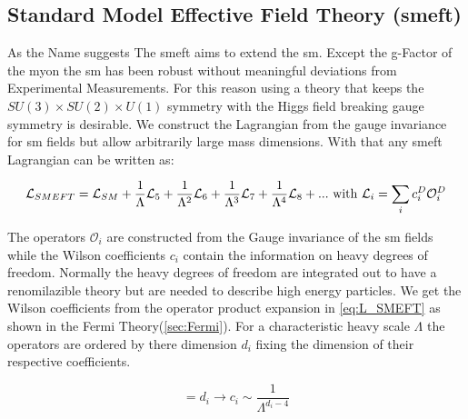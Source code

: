 \documentclass[../Bachelorarbeit.tex]{subfiles}
\begin{document}
\subsection{Standard Model Effective Field Theory (\acrshort{smeft})}
As the Name suggests The \acrshort{smeft} aims to extend the \acrshort{sm}.
Except the g-Factor of the myon the \acrshort{sm} has been robust without meaningful deviations from Experimental Measurements.
For this reason using a theory that keeps the $SU(3) \times SU(2) \times U(1)$ symmetry with the Higgs field breaking gauge symmetry is desirable.
We construct the Lagrangian from the gauge invariance for \acrshort{sm} fields but allow arbitrarily large mass dimensions.
With that any \acrshort{smeft} Lagrangian can be written as:

\begin{equation}
    \mathcal{L}_{SMEFT} = \mathcal{L}_{SM} + \frac{1}{\Lambda} \mathcal{L}_{5} + \frac{1}{\Lambda^2} \mathcal{L}_{6} + \frac{1}{\Lambda^3} \mathcal{L}_{7} + \frac{1}{\Lambda^4} \mathcal{L}_{8} + ... \textnormal{ with } \mathcal{L}_{i} = \sum_{i} c_{i}^{D} \mathcal{O}_{i}^{D}
    \label{eq:L_SMEFT}
\end{equation}

The operators $\mathcal{O}_{i}$ are constructed from the Gauge invariance of the \acrshort{sm} fields while the Wilson coefficients $c_{i}$ contain the information on heavy degrees of freedom.
Normally the heavy degrees of freedom are integrated out to have a renomilazible theory but are needed to describe high energy particles.
We get the Wilson coefficients from the operator product expansion in \ref{eq:L_SMEFT} as shown in the Fermi Theory(\ref{sec:Fermi}).
For a characteristic heavy scale $\Lambda$ the operators are ordered by there dimension $d_{i}$ fixing the dimension of their respective coefficients.

\begin{equation}
    [\mathcal{O}_i] = d_{i} \longrightarrow c_{i} \sim \frac{1}{\Lambda^{d_{i}-4}}
\end{equation}
\end{document}
